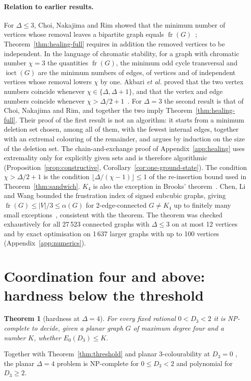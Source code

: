 \documentclass[aps,pre,twocolumn,floatfix,10pt]{revtex4-2}
\newtheorem{theorem}{Theorem}
\theoremstyle{definition}
\theoremstyle{remark}
\newcommand{\fr}{\operatorname{fr}}
\newcommand{\ioct}{\operatorname{ioct}}
\newcommand{\OPT}{E_0}
\begin{document}
\paragraph*{Relation to earlier results.}
For $\Delta\le3$, Choi, Nakajima and Rim showed that the minimum number of vertices whose removal
leaves a bipartite graph equals $\fr(G)$~\cite{Choi1989}; Theorem~\ref{thm:healing-full}
requires in addition the removed vertices to be independent. In the language of chromatic
stability, for a graph with chromatic number $\chi=3$ the quantities $\fr(G)$, the minimum odd cycle
transversal and $\ioct(G)$ are the minimum numbers of edges, of vertices and of independent
vertices whose removal lowers $\chi$ by one. Akbari \emph{et al.} proved that the two vertex
numbers coincide whenever $\chi\in\{\Delta,\Delta+1\}$, and that the vertex and edge numbers
coincide whenever $\chi>\Delta/2+1$~\cite{Akbari2022}. For $\Delta=3$ the second result is that of
Choi, Nakajima and Rim, and together the two imply Theorem~\ref{thm:healing-full}. Their proof of
the first result is not an algorithm: it starts from a minimum deletion set chosen, among all of
them, with the fewest internal edges, together with an extremal colouring of the remainder, and
argues by induction on the size of the deletion set. The chain-and-exchange proof of
Appendix~\ref{app:healing} uses extremality only for explicitly given sets and is therefore
algorithmic (Proposition~\ref{prop:constructive}, Corollary~\ref{cor:one-ground-state}). The
condition $\chi>\Delta/2+1$ is the condition $\lfloor\Delta/(\chi-1)\rfloor\le1$ of the
re-insertion bound used in Theorem~\ref{thm:sandwich}. $K_4$ is also the
exception in Brooks' theorem~\cite{Brooks1941}. Chen, Li and Wang bounded the frustration index of
signed subcubic graphs, giving $\fr(G)\le|V|/3\le\alpha(G)$ for 2-edge-connected $G\ne K_4$ up to
finitely many small exceptions~\cite{ChenLiWang2025}, consistent with the theorem. The theorem
was checked exhaustively for all 27\,523 connected graphs with $\Delta\le3$ on at most 12
vertices and by exact optimisation on 1\,637 larger graphs with up to 100 vertices
(Appendix~\ref{app:numerics}).

\section{Coordination four and above: hardness below the threshold}
\label{sec:hard4}
\begin{theorem}[hardness at $\Delta=4$]\label{thm:hard4}
For every fixed rational $0<D_3<2$ it is NP-complete to decide, given a planar graph $G$ of
maximum degree four and a number $K$, whether $\OPT(D_3)\le K$.
\end{theorem}
Together with Theorem~\ref{thm:threshold} and planar 3-colourability at $D_3=0$
\cite{GareyJohnsonStockmeyer1976}, the planar $\Delta=4$ problem is NP-complete for $0\le D_3<2$
and polynomial for $D_3\ge2$.
\end{document}
